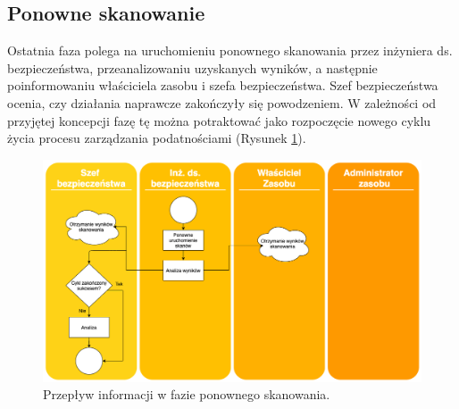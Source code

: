 \subsection{Ponowne skanowanie}
Ostatnia faza polega na uruchomieniu ponownego skanowania przez inżyniera ds. bezpieczeństwa, przeanalizowaniu uzyskanych wyników, a następnie poinformowaniu właściciela zasobu i szefa bezpieczeństwa. Szef bezpieczeństwa ocenia, czy działania naprawcze zakończyły się powodzeniem. W zależności od przyjętej koncepcji fazę tę można potraktować jako rozpoczęcie nowego cyklu życia procesu zarządzania podatnościami (Rysunek \ref{fig:rescan-flow}).
\begin{figure}[!ht]
\centering
\includegraphics[width=.9\textwidth]{Chapters/Wstep/p-vm/rescan-flow.png}
\caption{Przepływ informacji w fazie ponownego skanowania.}
\label{fig:rescan-flow}
\end{figure}


